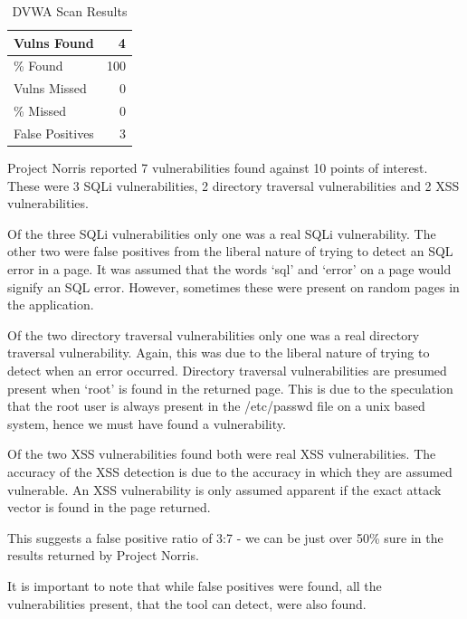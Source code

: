 \documentclass[12pt,a4paper]{article}
\begin{document}
\begin{center}
    \begin{table}
        \caption{DVWA Scan Results}
        \begin{center}
            \begin{tabular}{ | l | r | }
                \hline
                Vulns Found & 4 \\ \hline
                \% Found & 100 \\ \hline
                Vulns Missed & 0 \\ \hline
                \% Missed & 0 \\ \hline
                False Positives & 3 \\ 
                \hline
            \end{tabular}
        \end{center}
    \end{table}
\end{center}

Project Norris reported 7 vulnerabilities found against 10 points of interest.  These were 3 SQLi vulnerabilities, 2 directory traversal vulnerabilities and 2 XSS vulnerabilities.

Of the three SQLi vulnerabilities only one was a real SQLi vulnerability.  The other two were false positives from the liberal nature of trying to detect an SQL error in a page.  It was assumed that the words `sql' and `error' on a page would signify an SQL error.  However, sometimes these were present on random pages in the application.

Of the two directory traversal vulnerabilities only one was a real directory traversal vulnerability.  Again, this was due to the liberal nature of trying to detect when an error occurred.  Directory traversal vulnerabilities are presumed present when `root' is found in the returned page.  This is due to the speculation that the root user is always present in the /etc/passwd file on a unix based system, hence we must have found a vulnerability.

Of the two XSS vulnerabilities found both were real XSS vulnerabilities.  The accuracy of the XSS detection is due to the accuracy in which they are assumed vulnerable.  An XSS vulnerability is only assumed apparent if the exact attack vector is found in the page returned.

This suggests a false positive ratio of 3:7 - we can be just over 50\% sure in the results returned by Project Norris.

It is important to note that while false positives were found, all the vulnerabilities present, that the tool can detect, were also found.
\end{document}
